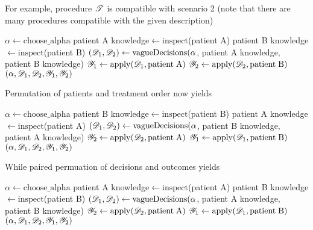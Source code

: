 For example, procedure $\mathscr{T}$ is compatible with scenario 2 (note that there are many procedures compatible with the given description)

\begin{algorithmic}
    \State $\alpha \gets \mathrm{choose\_alpha}$
    \State patient A knowledge$\gets \mathrm{inspect}$(patient A)
    \State patient B knowledge$\gets \mathrm{inspect}$(patient B)
    \State $(\mathscr{D}_1,\mathscr{D}_2) \gets \mathrm{vagueDecisions}(\alpha$, patient A knowledge, patient B knowledge)
    \State $\mathscr{Y}_1\gets \mathrm{apply}(\mathscr{D}_1,\mathrm{patient\;A})$
    \State $\mathscr{Y}_2\gets \mathrm{apply}(\mathscr{D}_2,\mathrm{patient\;B})$
    \State \Return $(\alpha,\mathscr{D}_1,\mathscr{D}_2,\mathscr{Y}_1,\mathscr{Y}_2)$
    \EndProcedure
\end{algorithmic}

Permutation of patients and treatment order now yields

\begin{algorithmic}
    \State $\alpha \gets \mathrm{choose\_alpha}$
    \State patient B knowledge$\gets \mathrm{inspect}$(patient B)
    \State patient A knowledge$\gets \mathrm{inspect}$(patient A)
    \State $(\mathscr{D}_1,\mathscr{D}_2) \gets \mathrm{vagueDecisions}(\alpha$, patient B knowledge, patient A knowledge)
    \State $\mathscr{Y}_2\gets \mathrm{apply}(\mathscr{D}_2,\mathrm{patient\;A})$
    \State $\mathscr{Y}_1\gets \mathrm{apply}(\mathscr{D}_1,\mathrm{patient\;B})$
    \State \Return $(\alpha,\mathscr{D}_1,\mathscr{D}_2,\mathscr{Y}_1,\mathscr{Y}_2)$
    \EndProcedure
\end{algorithmic}

While paired permuation of decisions and outcomes yields

\begin{algorithmic}
    \State $\alpha \gets \mathrm{choose\_alpha}$
    \State patient A knowledge$\gets \mathrm{inspect}$(patient A)
    \State patient B knowledge$\gets \mathrm{inspect}$(patient B)
    \State $(\mathscr{D}_1,\mathscr{D}_2) \gets \mathrm{vagueDecisions}(\alpha$, patient A knowledge, patient B knowledge)
    \State $\mathscr{Y}_2\gets \mathrm{apply}(\mathscr{D}_2,\mathrm{patient\;A})$
    \State $\mathscr{Y}_1\gets \mathrm{apply}(\mathscr{D}_1,\mathrm{patient\;B})$
    \State \Return $(\alpha,\mathscr{D}_1,\mathscr{D}_2,\mathscr{Y}_1,\mathscr{Y}_2)$
    \EndProcedure
\end{algorithmic}

